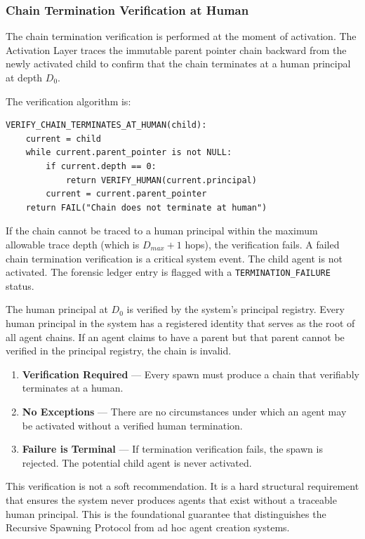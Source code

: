 \subsubsection{Chain Termination Verification at Human}

The chain termination verification is performed at the moment of activation. The Activation Layer traces the immutable parent pointer chain backward from the newly activated child to confirm that the chain terminates at a human principal at depth $D_0$.

The verification algorithm is:

\begin{verbatim}
VERIFY_CHAIN_TERMINATES_AT_HUMAN(child):
    current = child
    while current.parent_pointer is not NULL:
        if current.depth == 0:
            return VERIFY_HUMAN(current.principal)
        current = current.parent_pointer
    return FAIL("Chain does not terminate at human")
\end{verbatim}

If the chain cannot be traced to a human principal within the maximum allowable trace depth (which is $D_{max} + 1$ hops), the verification fails. A failed chain termination verification is a critical system event. The child agent is not activated. The forensic ledger entry is flagged with a \texttt{TERMINATION\_FAILURE} status.

The human principal at $D_0$ is verified by the system's principal registry. Every human principal in the system has a registered identity that serves as the root of all agent chains. If an agent claims to have a parent but that parent cannot be verified in the principal registry, the chain is invalid.

\begin{enumerate}
    \item \textbf{Verification Required} — Every spawn must produce a chain that verifiably terminates at a human.
    \item \textbf{No Exceptions} — There are no circumstances under which an agent may be activated without a verified human termination.
    \item \textbf{Failure is Terminal} — If termination verification fails, the spawn is rejected. The potential child agent is never activated.
\end{enumerate}

This verification is not a soft recommendation. It is a hard structural requirement that ensures the system never produces agents that exist without a traceable human principal. This is the foundational guarantee that distinguishes the Recursive Spawning Protocol from ad hoc agent creation systems.

